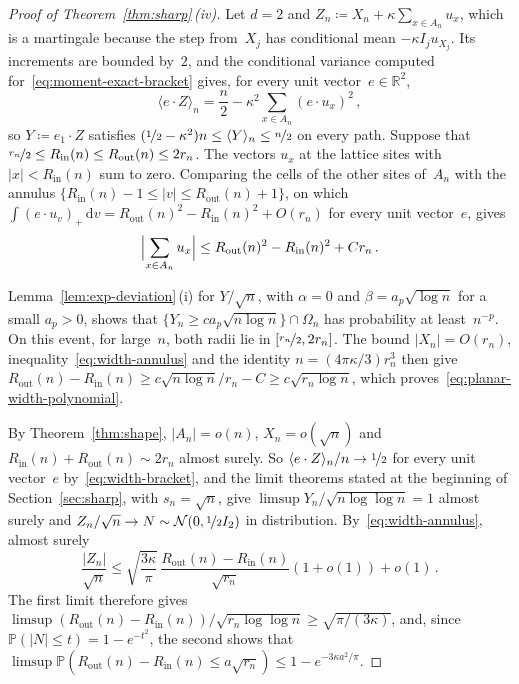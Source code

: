 \documentclass[11pt]{amsart}
\theoremstyle{plain}
\theoremstyle{definition}
\newcommand{\R}{\mathbb R}
\renewcommand{\P}{\mathbb P}
\newcommand{\drift}{\kappa}
\newcommand{\dd}{\,\mathrm d}
\newcommand{\nf}{\nicefrac}
\newcommand{\Rin}{R_{\mathrm{in}}}
\newcommand{\Rout}{R_{\mathrm{out}}}
\numberwithin{equation}{section}
\begin{document}
\begin{proof}[Proof of Theorem~\ref{thm:sharp}\,\textup{(iv)}]
Let $d=2$ and $Z_n\coloneqq X_n+\drift\sum_{x\in A_n}u_x$, which is a martingale because the step from~$X_j$ has conditional mean $-\drift I_ju_{X_j}$. Its increments are bounded by~$2$, and the conditional variance computed for~\eqref{eq:moment-exact-bracket} gives, for every unit vector~$e\in\R^2$,
\begin{equation}\label{eq:width-bracket}
\langle e\cdot Z\rangle_n=\frac n2-\drift^2\sum_{x\in A_n}(e\cdot u_x)^2\, ,
\end{equation}
so $Y\coloneqq e_1\cdot Z$ satisfies $(\nf12-\drift^2)n\leq\langle Y\rangle_n\leq\nf n2$ on every path. Suppose that $\nf{r_n}2\leq\Rin(n)\leq\Rout(n)\leq2r_n$. The vectors $u_x$ at the lattice sites with $|x|<\Rin(n)$ sum to zero. Comparing the cells of the other sites of~$A_n$ with the annulus $\{\Rin(n)-1\leq|v|\leq\Rout(n)+1\}$, on which $\int(e\cdot u_v)_+\dd v=\Rout(n)^2-\Rin(n)^2+O(r_n)$ for every unit vector~$e$, gives
\begin{equation}\label{eq:width-annulus}
\Bigl|\sum_{x\in A_n}u_x\Bigr|\leq\Rout(n)^2-\Rin(n)^2+Cr_n\, .
\end{equation}

Lemma~\ref{lem:exp-deviation}\,(i) for $Y/\sqrt n$, with $\alpha=0$ and $\beta=a_p\sqrt{\log n}$ for a small $a_p>0$, shows that $\{Y_n\geq ca_p\sqrt{n\log n}\}\cap\Omega_n$ has probability at least~$n^{-p}$. On this event, for large~$n$, both radii lie in $[\nf{r_n}2,2r_n]$. The bound $|X_n|=O(r_n)$, inequality~\eqref{eq:width-annulus} and the identity $n=(4\pi\drift/3)r_n^3$ then give $\Rout(n)-\Rin(n)\geq c\sqrt{n\log n}/r_n-C\geq c\sqrt{r_n\log n}$, which proves~\eqref{eq:planar-width-polynomial}.

By Theorem~\ref{thm:shape}, $|A_n|=o(n)$, $X_n=o(\sqrt n)$ and $\Rin(n)+\Rout(n)\sim2r_n$ almost surely. So $\langle e\cdot Z\rangle_n/n\to\nf12$ for every unit vector~$e$ by~\eqref{eq:width-bracket}, and the limit theorems stated at the beginning of Section~\ref{sec:sharp}, with $s_n=\sqrt n$, give $\limsup Y_n/\sqrt{n\log\log n}=1$ almost surely and $Z_n/\sqrt n\to N\sim\mathcal N(0,\nf12 I_2)$ in distribution. By~\eqref{eq:width-annulus}, almost surely
\begin{equation*}
\frac{|Z_n|}{\sqrt n}\leq\sqrt{\frac{3\drift}\pi}\,\frac{\Rout(n)-\Rin(n)}{\sqrt{r_n}}(1+o(1))+o(1)\, .
\end{equation*}
The first limit therefore gives $\limsup(\Rout(n)-\Rin(n))/\sqrt{r_n\log\log n}\geq\sqrt{\pi/(3\drift)}$, and, since $\P(|N|\leq t)=1-e^{-t^2}$, the second shows that $\limsup\P(\Rout(n)-\Rin(n)\leq a\sqrt{r_n})\leq1-e^{-3\drift a^2/\pi}$.
\end{proof}
\end{document}
